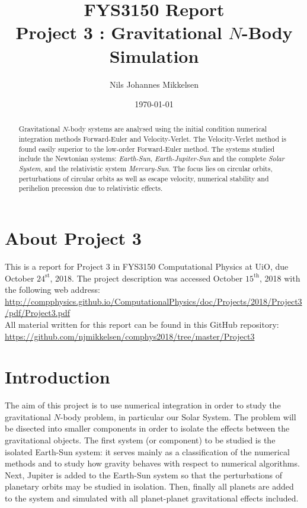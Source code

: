 \documentclass[reprint,english]{revtex4-1}
\begin{document}
\title{FYS3150 Report\\Project 3 : Gravitational \(N\)-Body Simulation}
\author{Nils Johannes Mikkelsen}
\date{\today}
\noaffiliation
\begin{abstract}
Gravitational \(N\)-body systems are analysed using the initial condition numerical integration methods Forward-Euler and Velocity-Verlet. The Velocity-Verlet method is found easily superior to the low-order Forward-Euler method. The systems studied include the Newtonian systems: \emph{Earth-Sun}, \emph{Earth-Jupiter-Sun} and the complete \emph{Solar System}, and the relativistic system \emph{Mercury-Sun}. The focus lies on circular orbits, perturbations of circular orbits as well as escape velocity, numerical stability and perihelion precession due to relativistic effects.
\end{abstract}
\maketitle

\section*{About Project 3}
This is a report for Project 3 in FYS3150 Computational Physics at UiO, due October \(24^{\text{st}}\), 2018. \cite{project3}
The project description was accessed October \(15^{\text{th}}\), 2018 with the following web address:\\
{\scriptsize\url{http://compphysics.github.io/ComputationalPhysics/doc/Projects/2018/Project3/pdf/Project3.pdf}}\\
All material written for this report can be found in this GitHub repository:\\
{\scriptsize\url{https://github.com/njmikkelsen/comphys2018/tree/master/Project3}}
\section{Introduction}
The aim of this project is to use numerical integration in order to study the gravitational \(N\)-body problem, in particular our Solar System. The problem will be disected into smaller components in order to isolate the effects between the gravitational objects. The first system (or component) to be studied is the isolated Earth-Sun system: it serves mainly as a classification of the numerical methods and to study how gravity behaves with respect to numerical algorithms. Next, Jupiter is added to the Earth-Sun system so that the perturbations of planetary orbits may be studied in isolation. Then, finally all planets are added to the system and simulated with all planet-planet gravitational effects included.
\end{document}

